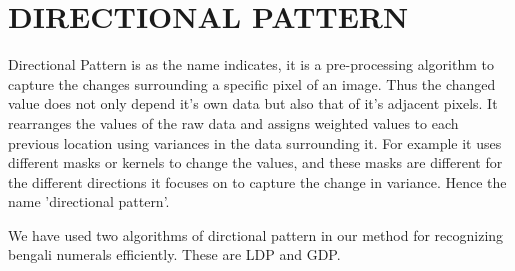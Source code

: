 \documentclass[conference]{IEEEtran}
\begin{document}

\section{DIRECTIONAL PATTERN}
Directional Pattern is as the name indicates, it is a pre-processing algorithm to capture the changes surrounding a specific pixel of an image. Thus the changed value does not only depend it's own data but also that of it's adjacent pixels. It rearranges the values of the raw data and assigns weighted values to each previous location using variances in the data surrounding it. For example it uses different masks or kernels to change the values, and these masks are different for the different directions it focuses on to capture the change in variance. Hence the name 'directional pattern'.

We have used two algorithms of dirctional pattern in our method for recognizing bengali numerals efficiently. These are LDP and GDP.
\end{document}
